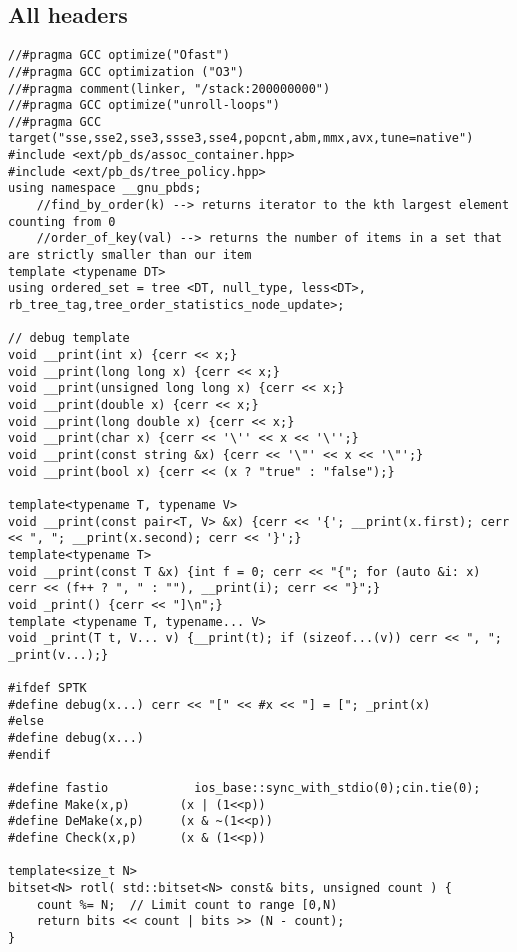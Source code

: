 \documentclass[FSZ,a4paper,onesided]{article}
\begin{document}
\begin{multicols*}{\COLS}
\tableofcontents
\newpage
{}

\section{All headers}
\begin{lstlisting}
//#pragma GCC optimize("Ofast")
//#pragma GCC optimization ("O3")
//#pragma comment(linker, "/stack:200000000")
//#pragma GCC optimize("unroll-loops")
//#pragma GCC target("sse,sse2,sse3,ssse3,sse4,popcnt,abm,mmx,avx,tune=native")
#include <ext/pb_ds/assoc_container.hpp>
#include <ext/pb_ds/tree_policy.hpp>
using namespace __gnu_pbds;
    //find_by_order(k) --> returns iterator to the kth largest element counting from 0
    //order_of_key(val) --> returns the number of items in a set that are strictly smaller than our item
template <typename DT> 
using ordered_set = tree <DT, null_type, less<DT>, rb_tree_tag,tree_order_statistics_node_update>;

// debug template
void __print(int x) {cerr << x;}
void __print(long long x) {cerr << x;}
void __print(unsigned long long x) {cerr << x;}
void __print(double x) {cerr << x;}
void __print(long double x) {cerr << x;}
void __print(char x) {cerr << '\'' << x << '\'';}
void __print(const string &x) {cerr << '\"' << x << '\"';}
void __print(bool x) {cerr << (x ? "true" : "false");}

template<typename T, typename V>
void __print(const pair<T, V> &x) {cerr << '{'; __print(x.first); cerr << ", "; __print(x.second); cerr << '}';}
template<typename T>
void __print(const T &x) {int f = 0; cerr << "{"; for (auto &i: x) cerr << (f++ ? ", " : ""), __print(i); cerr << "}";}
void _print() {cerr << "]\n";}
template <typename T, typename... V>
void _print(T t, V... v) {__print(t); if (sizeof...(v)) cerr << ", "; _print(v...);}

#ifdef SPTK
#define debug(x...) cerr << "[" << #x << "] = ["; _print(x)
#else
#define debug(x...)
#endif

#define fastio            ios_base::sync_with_stdio(0);cin.tie(0);
#define Make(x,p)       (x | (1<<p))
#define DeMake(x,p)     (x & ~(1<<p))
#define Check(x,p)      (x & (1<<p))

template<size_t N>
bitset<N> rotl( std::bitset<N> const& bits, unsigned count ) {
    count %= N;  // Limit count to range [0,N)
    return bits << count | bits >> (N - count);
}
\end{lstlisting}

\end{multicols*}
\end{document}
